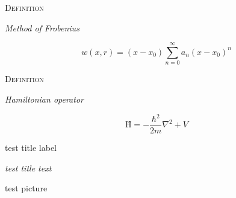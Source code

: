 \documentclass{article}
\newenvironment{flashcard}[2][]{%
\noindent  \textsc{#1} %

\vfill
\centerline{{\Large\emph{#2}}} %
\vfill
\newpage
}
{\newpage}
\begin{document}









\begin{flashcard}[Definition]{Method of Frobenius}

\begin{displaymath}
w(x,r)=(x-x_{0})\sum_{n=0}^{\infty}a_{n}(x-x_{0})^{n}
\end{displaymath}
\end{flashcard}

\begin{flashcard}[Definition]{Hamiltonian operator}
\begin{displaymath}
\textrm{\^H} = -\frac{\hbar^2}{2m}\nabla^2 + V
\end{displaymath}
\end{flashcard}



\noindent  test title label
\vfill
\centerline{{\Large\emph{test title text}}} %
\vfill
\newpage

\begin{center}
test picture
\end{center}
\newpage
\end{document}

